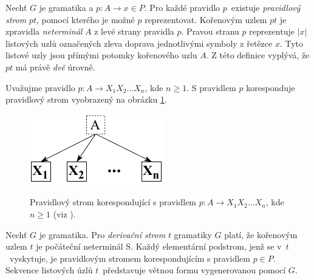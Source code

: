 \begin{definice}
  Nechť $G$ je gramatika a $p\!: A \rightarrow x \in P$. Pro každé pravidlo $p$~existuje \emph{pravidlový strom} $pt$, pomocí kterého je možné $p$
  reprezentovat. Kořenovým uzlem $pt$ je zpravidla \emph{neterminál} $A$ z levé strany pravidla $p$. Pravou stranu $p$ reprezentuje $|x|$ listových uzlů
  označených zleva doprava jednotlivými symboly z řetězce $x$.
  Tyto listové uzly jsou přímými potomky kořenového uzlu $A$. Z této definice vyplývá, že $pt$ má právě \emph{dvě} úrovně.

  Uvažujme pravidlo $p\!: A \rightarrow X_1 X_2 \dots X_n$, kde $n \geq 1$. S pravidlem $p$ koresponduje pravidlový strom vyobrazený na
  obrázku \ref{obrPravidlovyStrom}.
  \begin{figure}[h]\centering
    \centering
    \includegraphics[scale=1.1]{obrazky/PravidlovyStrom.pdf}\\[1pt]

    \caption{Pravidlový strom korespondující s pravidlem $p\!: A \rightarrow X_1 X_2 \dots X_n$, kde $n \geq 1$ (viz \cite{Meduna:2000:AutomataAndLanguages}).}
    \label{obrPravidlovyStrom}
  \end{figure}
\end{definice}

\begin{definice}
  Nechť $G$ je gramatika. Pro \emph{derivační strom} $t$ gramatiky $G$ platí, že kořenovým uzlem $t$ je počáteční neterminál S. Každý elementární podstrom,
  jenž se v~$t$~vyskytuje, je pravidlovým stromem korespondujícím s pravidlem $p \in P$. Sekvence listových úzlů $t$~představuje větnou formu vygenerovanou
  pomocí $G$.
\end{definice}

